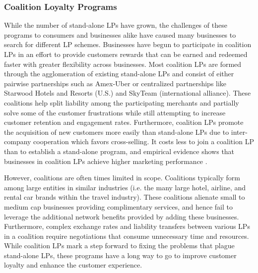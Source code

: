 \subsubsection{Coalition Loyalty Programs}
While the number of stand-alone LPs have grown, the challenges of these programs to consumers and businesses alike have caused many businesses to search for different LP schemes. Businesses have begun to participate in coalition LPs in an effort to provide customers rewards that can be earned and redeemed faster with greater flexibility across businesses. Most coalition LPs are formed through the agglomeration of existing stand-alone LPs and consist of either pairwise partnerships such as Amex-Uber or centralized partnerships like Starwood Hotels and Resorts (U.S.) and SkyTeam (international alliance). These coalitions help split liability among the participating merchants and partially solve some of the customer frustrations while still attempting to increase customer retention and engagement rates. Furthermore, coalition LPs promote the acquisition of new customers more easily than stand-alone LPs due to inter-company cooperation which favors cross-selling. It costs less to join a coalition LP than to establish a stand-alone program, and empirical evidence shows that businesses in coalition LPs achieve higher marketing performance \cite{VR16}. 

However, coalitions are often times limited in scope. Coalitions typically form among large entities in similar industries (i.e. the many large hotel, airline, and rental car brands within the travel industry). These coalitions alienate small to medium cap businesses providing complimentary services, and hence fail to leverage the additional network benefits provided by adding these businesses. Furthermore, complex exchange rates and liability transfers between various LPs in a coalition require negotiations that consume unnecessary time and resources. While coalition LPs mark a step forward to fixing the problems that plague stand-alone LPs, these programs have a long way to go to improve customer loyalty and enhance the customer experience.

